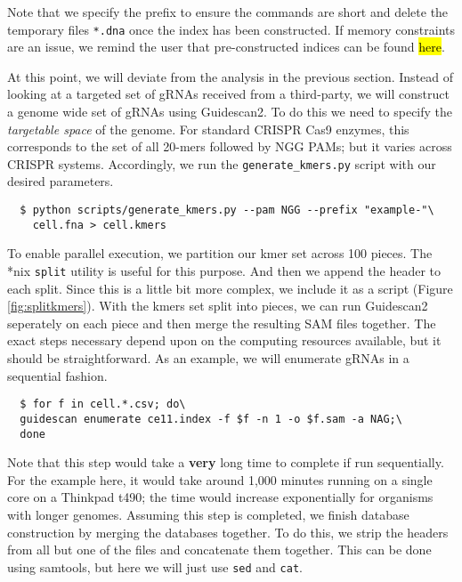 \documentclass[11pt]{article}
\begin{document}
Note that we specify the prefix to ensure the commands are short and
delete the temporary files \texttt{*.dna} once the index has been
constructed. If memory constraints are an issue, we remind the user
that pre-constructed indices can be found \hl{here}.

At this point, we will deviate from the analysis in the previous
section. Instead of looking at a targeted set of gRNAs received from a
third-party, we will construct a genome wide set of gRNAs using
Guidescan2. To do this we need to specify the {\it targetable space}
of the genome. For standard CRISPR Cas9 enzymes, this corresponds to
the set of all 20-mers followed by NGG PAMs; but it varies across
CRISPR systems. Accordingly, we run the \texttt{generate\_kmers.py}
script with our desired parameters.

\begin{verbatim}
  $ python scripts/generate_kmers.py --pam NGG --prefix "example-"\
    cell.fna > cell.kmers
\end{verbatim}

To enable parallel execution, we partition our kmer set across 100
pieces. The *nix \texttt{split} utility is useful for this
purpose. And then we append the header to each split. Since this is a
little bit more complex, we include it as a script (Figure
\ref{fig:splitkmers}). With the kmers set split into pieces, we can
run Guidescan2 seperately on each piece and then merge the resulting
SAM files together. The exact steps necessary depend upon on the
computing resources available, but it should be straightforward. As an
example, we will enumerate gRNAs in a sequential fashion.

\begin{verbatim}
  $ for f in cell.*.csv; do\
  guidescan enumerate ce11.index -f $f -n 1 -o $f.sam -a NAG;\
  done
\end{verbatim}

Note that this step would take a \textbf{very} long time to complete
if run sequentially. For the example here, it would take around 1,000
minutes running on a single core on a Thinkpad t490; the time would
increase exponentially for organisms with longer genomes. Assuming
this step is completed, we finish database construction by merging the
databases together. To do this, we strip the headers from all but one
of the files and concatenate them together. This can be done using
samtools, but here we will just use \texttt{sed} and \texttt{cat}.
\end{document}
